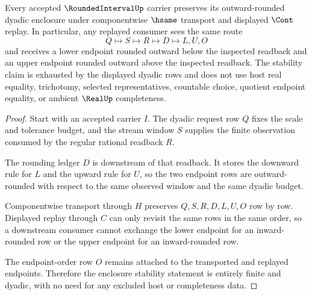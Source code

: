 \begin{theorem}
\label{thm:rounded-interval-dyadic-enclosure-stability}
Every accepted $\RoundedIntervalUp$ carrier preserves its outward-rounded dyadic enclosure under componentwise $\hsame$ transport and displayed $\Cont$ replay. In particular, any replayed consumer sees the same route
$$
Q\longmapsto S\longmapsto R\longmapsto D\longmapsto L,U,O
$$
and receives a lower endpoint rounded outward below the inspected readback and an upper endpoint rounded outward above the inspected readback. The stability claim is exhausted by the displayed dyadic rows and does not use host real equality, trichotomy, selected representatives, countable choice, quotient endpoint equality, or ambient $\RealUp$ completeness.
\end{theorem}
\begin{proof}
Start with an accepted carrier $I$. The dyadic request row $Q$ fixes the scale and tolerance budget, and the stream window $S$ supplies the finite observation consumed by the regular rational readback $R$.

The rounding ledger $D$ is downstream of that readback. It stores the downward rule for $L$ and the upward rule for $U$, so the two endpoint rows are outward-rounded with respect to the same observed window and the same dyadic budget.

Componentwise transport through $H$ preserves $Q,S,R,D,L,U,O$ row by row. Displayed replay through $C$ can only revisit the same rows in the same order, so a downstream consumer cannot exchange the lower endpoint for an inward-rounded row or the upper endpoint for an inward-rounded row.

The endpoint-order row $O$ remains attached to the transported and replayed endpoints. Therefore the enclosure stability statement is entirely finite and dyadic, with no need for any excluded host or completeness data.
\end{proof}

